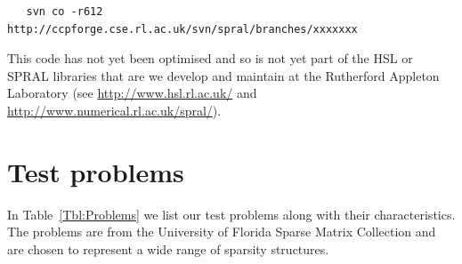 \documentclass{article}
\begin{document}
\begin{verbatim}
   svn co -r612 http://ccpforge.cse.rl.ac.uk/svn/spral/branches/xxxxxxx
\end{verbatim}

This code has not yet been optimised and so is not yet
part of the HSL or SPRAL libraries that are we develop
and maintain at the Rutherford Appleton Laboratory (see
\url{http://www.hsl.rl.ac.uk/} and \url{http://www.numerical.rl.ac.uk/spral/}).

\clearpage


\appendix

\section{Test problems}\label{appendix}
\setcounter{equation}{0}
\setcounter{table}{0}
\setcounter{figure}{0}
\setcounter{table}{0}
\renewcommand{\thetable}{A.\arabic{table}}


In Table~\ref{Tbl:Problems} we list  our test problems along with 
their characteristics. The problems are from the 
University of Florida Sparse Matrix Collection  and are chosen 
to represent a wide range of sparsity structures.
\end{document}
